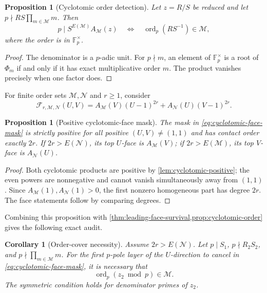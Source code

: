 \documentclass[11pt,oneside]{article}
\newtheorem{proposition}[theorem]{Proposition}
\newtheorem{corollary}[theorem]{Corollary}
\theoremstyle{definition}
\theoremstyle{remark}
\newcommand{\ord}{\operatorname{ord}}
\begin{document}
\begin{proposition}[Cyclotomic order detection]
\label{prop:cyclotomic-order}
Let $z=R/S$ be reduced and let $p\nmid RS\prod_{m\in\mathcal M}m$.  Then
\begin{equation}
 p\mid S^{E(\mathcal M)}A_{\mathcal M}(z)
 \quad\Longleftrightarrow\quad
 \ord_p(RS^{-1})\in\mathcal M,
 \label{eq:order-detection}
\end{equation}
where the order is in $\mathbb F_p^\times$.
\end{proposition}

\begin{proof}
The denominator is a $p$-adic unit.  For $p\nmid m$, an element of
$\mathbb F_p^\times$ is a root of $\Phi_m$ if and only if it has exact multiplicative order
$m$.  The product vanishes precisely when one factor does.
\end{proof}

For finite order sets $\mathcal M,\mathcal N$ and $r\ge1$, consider
\begin{equation}
 \mathcal F_{r,\mathcal M,\mathcal N}(U,V)
 =A_{\mathcal M}(V)(U-1)^{2r}
  +A_{\mathcal N}(U)(V-1)^{2r}.
 \label{eq:cyclotomic-face-mask}
\end{equation}

\begin{proposition}[Positive cyclotomic-face mask]
\label{prop:positive-cyclotomic-mask}
The mask in \eqref{eq:cyclotomic-face-mask} is strictly positive for all positive
$(U,V)\ne(1,1)$ and has contact order exactly $2r$.  If
$2r>E(\mathcal N)$, its top $U$-face is $A_{\mathcal M}(V)$; if
$2r>E(\mathcal M)$, its top $V$-face is $A_{\mathcal N}(U)$.
\end{proposition}

\begin{proof}
Both cyclotomic products are positive by \cref{lem:cyclotomic-positive}; the even powers are
nonnegative and cannot vanish simultaneously away from $(1,1)$.  Since
$A_{\mathcal M}(1),A_{\mathcal N}(1)>0$, the first nonzero homogeneous part has degree $2r$.
The face statements follow by comparing degrees.
\end{proof}

Combining this proposition with \cref{thm:leading-face-survival,prop:cyclotomic-order} gives
the following exact audit.

\begin{corollary}[Order-cover necessity]
\label{cor:order-cover-necessity}
Assume $2r>E(\mathcal N)$.  Let $p\mid S_1$, $p\nmid R_2S_2$, and
$p\nmid\prod_{m\in\mathcal M}m$.  For the first $p$-pole layer of the $U$-direction to
cancel in \eqref{eq:cyclotomic-face-mask}, it is necessary that
\begin{equation}
 \ord_p(z_2\bmod p)\in\mathcal M.
 \label{eq:order-cover-necessary}
\end{equation}
The symmetric condition holds for denominator primes of $z_2$.
\end{corollary}
\end{document}
